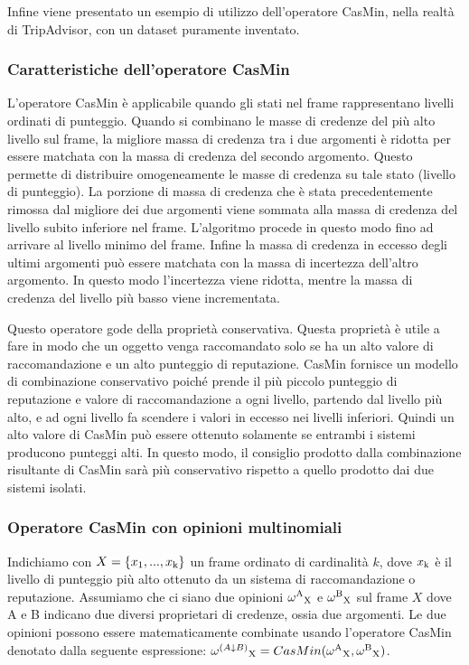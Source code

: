 \documentclass{report}
\begin{document}
	Infine viene presentato un esempio di utilizzo dell'operatore CasMin,
	nella realtà di TripAdvisor, con un dataset puramente inventato.
	
	\hypertarget{header-n146}{%
		\subsubsection{Caratteristiche dell'operatore
			CasMin}\label{header-n146}}
	
	L'operatore CasMin è applicabile quando gli stati nel frame
	rappresentano livelli ordinati di punteggio. Quando si combinano le
	masse di credenze del più alto livello sul frame, la migliore massa di
	credenza tra i due argomenti è ridotta per essere matchata con la massa
	di credenza del secondo argomento. Questo permette di distribuire
	omogeneamente le masse di credenza su tale stato (livello di punteggio). La porzione di massa
	di credenza che è stata precedentemente rimossa dal migliore dei due
	argomenti viene sommata alla massa di credenza del livello subito
	inferiore nel frame. L'algoritmo procede in questo modo fino ad arrivare
	al livello minimo del frame. Infine la massa di credenza in eccesso degli ultimi
	argomenti può essere matchata con la massa di incertezza dell'altro
	argomento. In questo modo l'incertezza viene ridotta, mentre la massa di
	credenza del livello più basso viene incrementata.
	
	Questo operatore gode della proprietà conservativa. Questa proprietà è
	utile a fare in modo che un oggetto venga raccomandato solo se ha un
	alto valore di raccomandazione e un alto punteggio di reputazione.
	CasMin fornisce un modello di combinazione conservativo poiché prende il
	più piccolo punteggio di reputazione e valore di raccomandazione a ogni
	livello, partendo dal livello più alto, e ad ogni livello fa scendere i
	valori in eccesso nei livelli inferiori. Quindi un alto valore di CasMin
	può essere ottenuto solamente se entrambi i sistemi producono punteggi
	alti. In questo modo, il consiglio prodotto dalla combinazione
	risultante di CasMin sarà più conservativo rispetto a quello prodotto
	dai due sistemi isolati.
	
	\hypertarget{header-n151}{%
		\subsubsection{Operatore CasMin con opinioni
			multinomiali}\label{header-n151}}
	
	Indichiamo con $X=\{x\textsubscript{1} ,...,x\textsubscript{k}\}$ un frame
	ordinato di cardinalità $k$, dove $x\textsubscript{k}$ è il livello di punteggio più alto
	ottenuto da un sistema di raccomandazione o reputazione. Assumiamo che
	ci siano due opinioni $\omega\textsuperscript{A}\textsubscript{X}$ e $\omega\textsuperscript{B}\textsubscript{X}$ sul frame $X$ dove A e B indicano
	due diversi proprietari di credenze, ossia due argomenti. Le due
	opinioni possono essere matematicamente combinate usando l'operatore
	CasMin denotato dalla seguente espressione: $\omega^{(A \downarrow B)}\textsubscript{X}=CasMin(\omega\textsuperscript{A}\textsubscript{X}, \omega\textsuperscript{B}\textsubscript{X})$.
	
\end{document}
